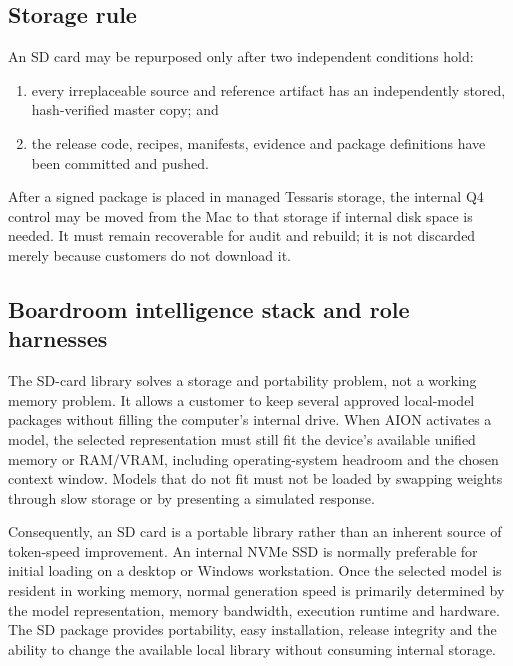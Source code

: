 \subsection{Storage rule}

An SD card may be repurposed only after two independent conditions hold:
\begin{enumerate}
  \item every irreplaceable source and reference artifact has an independently
  stored, hash-verified master copy; and
  \item the release code, recipes, manifests, evidence and package definitions
  have been committed and pushed.
\end{enumerate}
After a signed package is placed in managed Tessaris storage, the internal Q4
control may be moved from the Mac to that storage if internal disk space is
needed.  It must remain recoverable for audit and rebuild; it is not discarded
merely because customers do not download it.

\subsection{Boardroom intelligence stack and role harnesses}

The SD-card library solves a storage and portability problem, not a working
memory problem.  It allows a customer to keep several approved local-model
packages without filling the computer's internal drive.  When AION activates a
model, the selected representation must still fit the device's available
unified memory or RAM/VRAM, including operating-system headroom and the chosen
context window.  Models that do not fit must not be loaded by swapping weights
through slow storage or by presenting a simulated response.

Consequently, an SD card is a portable library rather than an inherent source
of token-speed improvement.  An internal NVMe SSD is normally preferable for
initial loading on a desktop or Windows workstation.  Once the selected model
is resident in working memory, normal generation speed is primarily determined
by the model representation, memory bandwidth, execution runtime and hardware.
The SD package provides portability, easy installation, release integrity and
the ability to change the available local library without consuming internal
storage.

